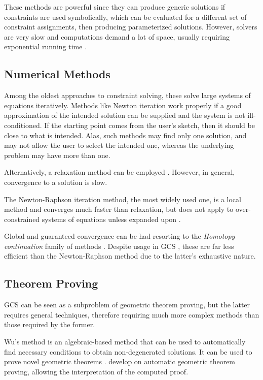 These methods are powerful since they can produce generic solutions if
constraints are used symbolically, which can be evaluated for a different set of
constraint assignments, then producing parameterized solutions.  However,
solvers are very slow and computations demand a lot of space, usually requiring
exponential running time \cite{Durand:1998:SNTCS}.

\subsection{Numerical Methods}
\label{sec:intro.constraints.numerical}

Among the oldest approaches to constraint solving, these solve large systems of
equations iteratively.  Methods like Newton iteration work properly if a good
approximation of the intended solution can be supplied and the system is not
ill-conditioned.  If the starting point comes from the user's sketch, then it
should be close to what is intended.  Alas, such methods may find only one
solution, and may not allow the user to select the intended one, whereas the
underlying problem may have more than one.

Alternatively, a relaxation method can be employed
\cite{Borning:1989:PLATL,Hillyard:1978:CNSTDT,Sutherland:1964:Sketchpad}.
However, in general, convergence to a solution is slow.

The Newton-Raphson iteration method, the most widely used one, is a local method
and converges much faster than relaxation, but does not apply to
over-constrained systems of equations unless expanded upon
\cite{Dedieu:2000:Newton}.

Global and guaranteed convergence can be had resorting to the \textit{Homotopy
continuation} family of methods \cite{Allgower:1993:CPF}.  Despite usage in
\ac{GCS} \cite{Durand:1998:SNTCS,Lamure:1996:SGCH}, these are far less efficient
than the Newton-Raphson method due to the latter's exhaustive nature.

\subsection{Theorem Proving}
\label{sec:intro.constraints.proving}

\ac{GCS} can be seen as a subproblem of geometric theorem proving, but the
latter requires general techniques, therefore requiring much more complex
methods than those required by the former.

Wu's method is an algebraic-based method that can be used to automatically find
necessary conditions to obtain non-degenerated solutions.  It can be used to
prove novel geometric theorems \cite{Chou:1988:IWMMTPG}.
\citet{Chou:1996:AGRPGI:1,Chou:1996:AGRPGI:2} develop on automatic geometric
theorem proving, allowing the interpretation of the computed proof.

